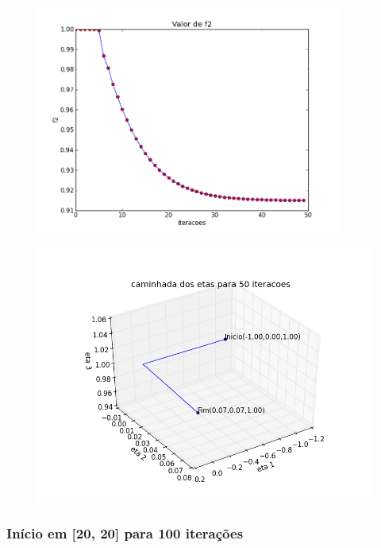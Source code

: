 \documentclass[12pt]{article}
\begin{document}
\begin{figure}[!h]
\begin{center}
\includegraphics[width=10cm]{0_0_f_2.png}
\end{center}
\end{figure}

\begin{figure}[!h]
\begin{center}
\includegraphics[width=12cm]{0_0_caminhada.png}
\end{center}
\end{figure}

\clearpage
\subsubsection{Início em [20, 20] para 100 iterações}
\mbox{}
\end{document}
